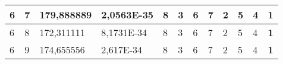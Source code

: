 \documentclass[conference]{IEEEtran}
\begin{document}
\begin{table*}[]
\begin{tabular}{|llll|llllllll|}
\multicolumn{1}{|l|}{6}                                                     & \multicolumn{1}{l|}{7}                                                        & \multicolumn{1}{l|}{179,888889}                                                   & 2,0563E-35                     & \multicolumn{1}{l|}{8}                                                  & \multicolumn{1}{l|}{3}                                                  & \multicolumn{1}{l|}{6}                                                  & \multicolumn{1}{l|}{7}                                                  & \multicolumn{1}{l|}{2}                                                  & \multicolumn{1}{l|}{5}                                                  & \multicolumn{1}{l|}{4}                                                  & \textbf{1}                 \\ \hline
\multicolumn{1}{|l|}{6}                                                     & \multicolumn{1}{l|}{8}                                                        & \multicolumn{1}{l|}{172,311111}                                                   & 8,1731E-34                     & \multicolumn{1}{l|}{8}                                                  & \multicolumn{1}{l|}{3}                                                  & \multicolumn{1}{l|}{6}                                                  & \multicolumn{1}{l|}{7}                                                  & \multicolumn{1}{l|}{2}                                                  & \multicolumn{1}{l|}{5}                                                  & \multicolumn{1}{l|}{4}                                                  & \textbf{1}                 \\ \hline
\multicolumn{1}{|l|}{6}                                                     & \multicolumn{1}{l|}{9}                                                        & \multicolumn{1}{l|}{174,655556}                                                   & 2,617E-34                      & \multicolumn{1}{l|}{8}                                                  & \multicolumn{1}{l|}{3}                                                  & \multicolumn{1}{l|}{6}                                                  & \multicolumn{1}{l|}{7}                                                  & \multicolumn{1}{l|}{2}                                                  & \multicolumn{1}{l|}{5}                                                  & \multicolumn{1}{l|}{4}                                                  & \textbf{1}                 \\ \hline

\end{tabular}
\end{table*}
\end{document}
